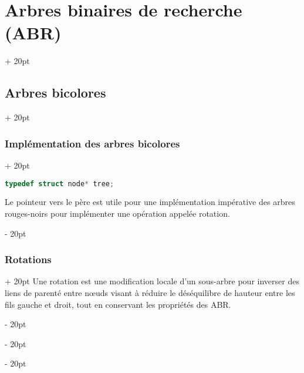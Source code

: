 \documentclass[a4paper, 12pt, twoside]{article}
\newcommand{\ind}[1][20pt]{\advance\leftskip + #1}
\newcommand{\deind}[1][20pt]{\advance\leftskip - #1}
\newenvironment{indt}[2][20pt]{#2 \par \ind[#1]}{\par \deind} %
\begin{document}
\begin{indt}{\section{Arbres binaires de recherche (ABR)}}
\begin{indt}{\subsection{Arbres bicolores}}
\begin{indt}{\subsubsection{Implémentation des arbres bicolores}}
\begin{lstlisting}[language=C, xleftmargin=80pt]
typedef struct node* tree;\end{lstlisting}
                
                Le pointeur vers le père est utile pour une implémentation impérative des arbres rouges-noirs pour implémenter une opération appelée rotation.
            \end{indt}
            
            \vspace{12pt}
            
            \begin{indt}{\subsubsection{Rotations}}
                Une rotation est une modification locale d'un sous-arbre pour inverser des liens de parenté entre n\oe uds visant à réduire le déséquilibre de hauteur entre les fils gauche et droit, tout en conservant les propriétés des ABR.
                

\end{indt}
\end{indt}
\end{indt}
\end{document}
